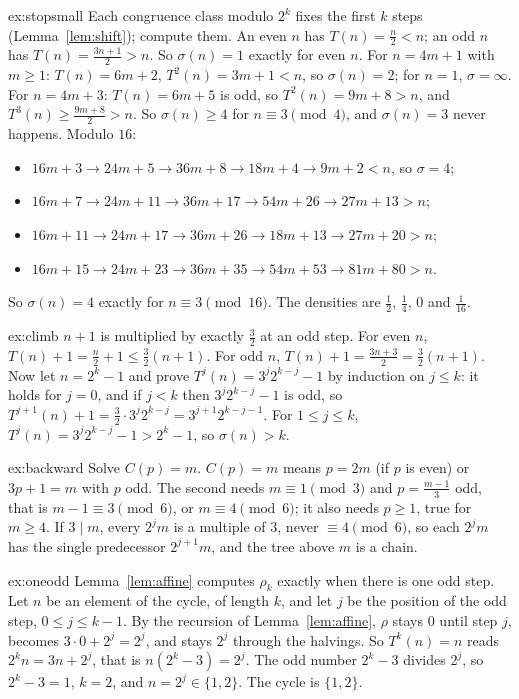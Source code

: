 \begin{solution}{ex:stopsmall}
\idea Each congruence class modulo $2^k$ fixes the first $k$ steps (Lemma~\ref{lem:shift}); compute them.
\writeup An even $n$ has $T(n)=\frac n2<n$; an odd $n$ has $T(n)=\frac{3n+1}2>n$. So $\sigma(n)=1$ exactly for even $n$. For $n=4m+1$ with $m\ge1$:
$T(n)=6m+2$, $T^2(n)=3m+1<n$, so $\sigma(n)=2$; for $n=1$, $\sigma=\infty$. For $n=4m+3$: $T(n)=6m+5$ is odd, so $T^2(n)=9m+8>n$, and $T^3(n)\ge\frac{9m+8}2>n$.
So $\sigma(n)\ge4$ for $n\equiv3\pmod4$, and $\sigma(n)=3$ never happens. Modulo $16$:
\begin{itemize}
\item $16m+3\to24m+5\to36m+8\to18m+4\to9m+2<n$, so $\sigma=4$;
\item $16m+7\to24m+11\to36m+17\to54m+26\to27m+13>n$;
\item $16m+11\to24m+17\to36m+26\to18m+13\to27m+20>n$;
\item $16m+15\to24m+23\to36m+35\to54m+53\to81m+80>n$.
\end{itemize}
So $\sigma(n)=4$ exactly for $n\equiv3\pmod{16}$. The densities are $\frac12$, $\frac14$, $0$ and $\frac1{16}$.
\end{solution}

\begin{solution}{ex:climb}
\idea $n+1$ is multiplied by exactly $\frac32$ at an odd step.
\writeup For even $n$, $T(n)+1=\frac n2+1\le\frac32(n+1)$. For odd $n$, $T(n)+1=\frac{3n+3}2=\frac32(n+1)$. Now let $n=2^k-1$ and prove
$T^j(n)=3^j2^{k-j}-1$ by induction on $j\le k$: it holds for $j=0$, and if $j<k$ then $3^j2^{k-j}-1$ is odd, so
$T^{j+1}(n)+1=\frac32\cdot3^j2^{k-j}=3^{j+1}2^{k-j-1}$. For $1\le j\le k$, $T^j(n)=3^j2^{k-j}-1>2^k-1$, so $\sigma(n)>k$.
\end{solution}

\begin{solution}{ex:backward}
\idea Solve $C(p)=m$.
\writeup $C(p)=m$ means $p=2m$ (if $p$ is even) or $3p+1=m$ with $p$ odd. The second needs $m\equiv1\pmod3$ and $p=\frac{m-1}3$ odd, that is
$m-1\equiv3\pmod6$, or $m\equiv4\pmod6$; it also needs $p\ge1$, true for $m\ge4$. If $3\mid m$, every $2^jm$ is a multiple of $3$, never
$\equiv4\pmod6$, so each $2^jm$ has the single predecessor $2^{j+1}m$, and the tree above $m$ is a chain.
\end{solution}

\begin{solution}{ex:oneodd}
\idea Lemma~\ref{lem:affine} computes $\rho_k$ exactly when there is one odd step.
\writeup Let $n$ be an element of the cycle, of length $k$, and let $j$ be the position of the odd step, $0\le j\le k-1$. By the recursion of
Lemma~\ref{lem:affine}, $\rho$ stays $0$ until step $j$, becomes $3\cdot0+2^j=2^j$, and stays $2^j$ through the halvings. So $T^k(n)=n$ reads
$2^kn=3n+2^j$, that is $n(2^k-3)=2^j$. The odd number $2^k-3$ divides $2^j$, so $2^k-3=1$, $k=2$, and $n=2^j\in\{1,2\}$. The cycle is $\{1,2\}$.
\end{solution}

